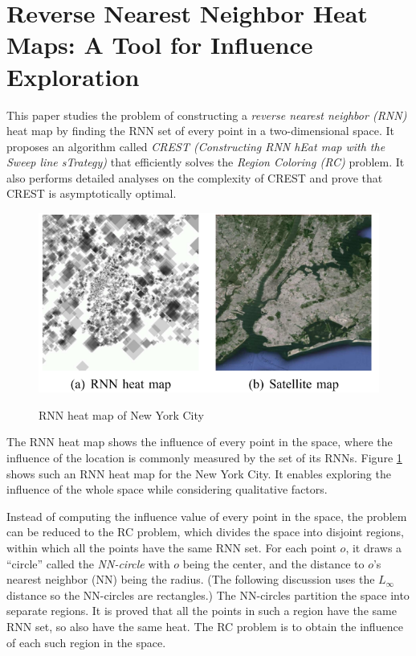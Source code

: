 \documentclass[paper=a4, fontsize=18pt]{article} %
\numberwithin{equation}{section} %
\numberwithin{figure}{section} %
\numberwithin{table}{section} %
\begin{document}
\section{Reverse Nearest Neighbor Heat Maps: A Tool for Influence Exploration \cite{SZXQD16}}

This paper studies the problem of constructing a \emph{reverse nearest neighbor (RNN)} heat map by finding the RNN set of every point in a two-dimensional space. It proposes an algorithm called \emph{CREST (Constructing RNN hEat map with the Sweep line sTrategy)} that efficiently solves the \emph{Region Coloring (RC)} problem. It also performs detailed analyses on the complexity of CREST and prove that CREST is asymptotically optimal.

\begin{figure}[h]
  \centering
  \includegraphics[width=.6\linewidth]{8_22_rnnheat.png}\\
  \caption{RNN heat map of New York City}\label{fig:heat}
\end{figure}

The RNN heat map shows the influence of every point in the space, where the influence of the location is commonly measured by the set of its RNNs. Figure \ref{fig:heat} shows such an RNN heat map for the New York City. It enables exploring the influence of the whole space while considering qualitative factors.

Instead of computing the influence value of every point in the space, the problem can be reduced to the RC problem, which divides the space into disjoint regions, within which all the points have the same RNN set. For each point $o$, it draws a ``circle'' called the \emph{NN-circle} with $o$ being the center, and the distance to $o$'s nearest neighbor (NN) being the radius. (The following discussion uses the $L_\infty$ distance so the NN-circles are rectangles.) The NN-circles partition the space into separate regions. It is proved that all the points in such a region have the same RNN set, so also have the same heat. The RC problem is to obtain the influence of each such region in the space.
\end{document}
